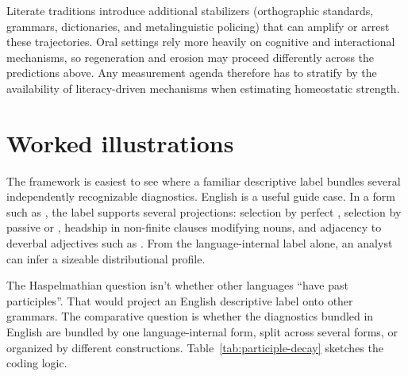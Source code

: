 \documentclass[12pt]{article}
\begin{document}
Literate traditions introduce additional stabilizers (orthographic standards, grammars, dictionaries, and metalinguistic policing) that can amplify or arrest these trajectories. Oral settings rely more heavily on cognitive and interactional mechanisms, so regeneration and erosion may proceed differently across the predictions above. Any measurement agenda therefore has to stratify by the availability of literacy-driven mechanisms when estimating homeostatic strength.

\section{Worked illustrations}\label{sec:illustrations}
The framework is easiest to see where a familiar descriptive label bundles several independently recognizable diagnostics. English  is a useful guide case. In a form such as , the label supports several projections: selection by perfect , selection by passive  or , headship in non-finite clauses modifying nouns, and adjacency to deverbal adjectives such as . From the language-internal label alone, an analyst can infer a sizeable distributional profile.

The Haspelmathian question isn't whether other languages \enquote{have past participles}. That would project an English descriptive label onto other grammars. The comparative question is whether the diagnostics bundled in English are bundled by one language-internal form, split across several forms, or organized by different constructions. Table~\ref{tab:participle-decay} sketches the coding logic.
\end{document}
